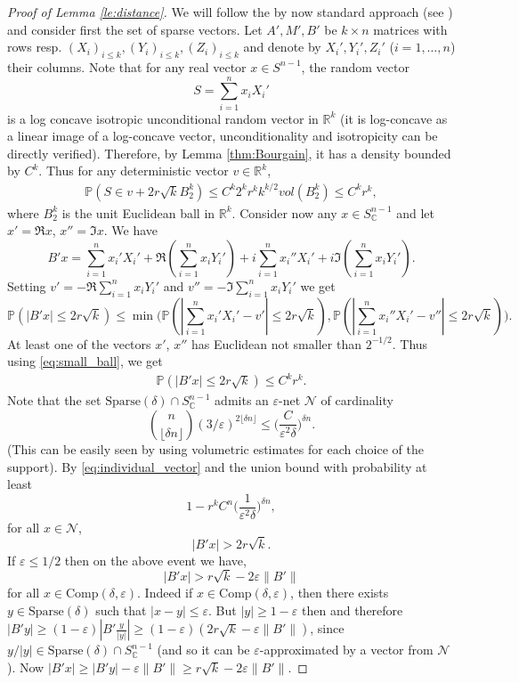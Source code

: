 \documentclass[12pt,reqno]{amsart}
\begin{document}
\begin{proof}[Proof of Lemma \ref{le:distance}]
We will follow the by now standard approach (see \cite{RV,LPRT}) and consider
first the set of sparse vectors. Let $A',M',B'$ be $k\times n$ matrices with
rows resp. $(X_i)_{i\le k},(Y_i)_{i\le k}, (Z_i)_{i\le k}$ and denote by
$X_i',Y_i',Z_i'$ ($i=1,\ldots,n$) their columns. Note that for any real vector
$x \in S^{n-1}$, the random vector
\[
S = \sum_{i=1}^n x_i X_i'
\]
is a log concave isotropic unconditional random vector in ${\mathbb{R}}^k$ (it is
log-concave as a linear image of a log-concave vector, unconditionality and
isotropicity can be directly verified).
Therefore, by Lemma \ref{thm:Bourgain}, it has a density bounded by $C^k$.
Thus for any deterministic vector $v \in {\mathbb{R}}^k$,
\begin{align}\label{eq:small_ball}
{\mathbb{P}}(S \in v + 2r\sqrt{k}B_2^k) \le C^k2^k r^k k^{k/2}vol(B_2^k) \le C^k r^k,
\end{align}
where $B_2^k$ is the unit Euclidean ball in ${\mathbb{R}}^k$. Consider now any $x \in
S_{\mathbb{C}}^{n-1}$ and let $x' = \Re x$, $x'' = \Im x$. We have
\[
B'x = \sum_{i=1}^n x_i' X_i' + \Re (\sum_{i=1}^n x_i Y_i') + i\sum_{i=1}^n
x_i'' X_i' + i\Im (\sum_{i=1}^n x_i Y_i').
\]
Setting $v' = -\Re\sum_{i=1}^n x_i Y_i'$ and $v'' = - \Im \sum_{i=1}^n x_i
Y_i'$ we get
\[
  {\mathbb{P}}(|B' x| \le 2r\sqrt{k})   \le \min\Big({\mathbb{P}}( |\sum_{i=1}^n x_i' X_i' - v'|\le 2r\sqrt{k}), {\mathbb{P}}( |\sum_{i=1}^n x_i'' X_i' - v''|\le 2r\sqrt{k})\Big).
\]
At least one of the vectors $x'$, $x''$ has Euclidean not smaller than
$2^{-1/2}$. Thus using \eqref{eq:small_ball}, we get
\begin{align}\label{eq:individual_vector}
{\mathbb{P}}(|B' x| \le 2r\sqrt{k}) \le C^kr^k.
\end{align}
Note that the set ${\mathrm{Sparse}}(\delta)\cap S_{\mathbb{C}}^{n-1}$ admits an $\varepsilon$-net
$\mathcal{N}$ of cardinality
\[
\binom{n}{\lfloor \delta n\rfloor }(3/\varepsilon)^{2\lfloor\delta n\rfloor} \le \Big(\frac{C}{\varepsilon^2 \delta}\Big)^{\delta n}.
\]
(This can be easily seen by using volumetric estimates for each choice of the support).
By \eqref{eq:individual_vector} and the union bound with probability at least
\[
1 -r^kC^n\Big(\frac{1}{\varepsilon^2 \delta}\Big)^{\delta n},
\]
for all $x \in \mathcal{N}$,
\[
|B'x| > 2r \sqrt{k}.
\]
If $\varepsilon \le 1/2$ then on the above event we have,
\[
|B'x| > r\sqrt{k} - 2\varepsilon \|B'\|
\]
for all $x \in {\mathrm{Comp}}(\delta,\varepsilon)$. Indeed if $x \in
{\mathrm{Comp}}(\delta,\varepsilon)$, then there exists $y \in {\mathrm{Sparse}}(\delta)$ such
that $|x-y| \le \varepsilon$. But $|y| \ge 1- \varepsilon$ then and therefore
$|B'y| \ge (1-\varepsilon)|B'\frac{y}{|y|}| \ge (1-\varepsilon)(2r\sqrt{k} -
\varepsilon\|B'\|)$, since $y/|y| \in {\mathrm{Sparse}}(\delta)\cap S_{\mathbb{C}}^{n-1}$ (and so
it can be $\varepsilon$-approximated by a vector from $\mathcal{N}$). Now
$|B'x| \ge |B'y| - \varepsilon \|B'\| \ge r\sqrt{k} - 2\varepsilon\|B'\|$.


\end{proof}
\end{document}
